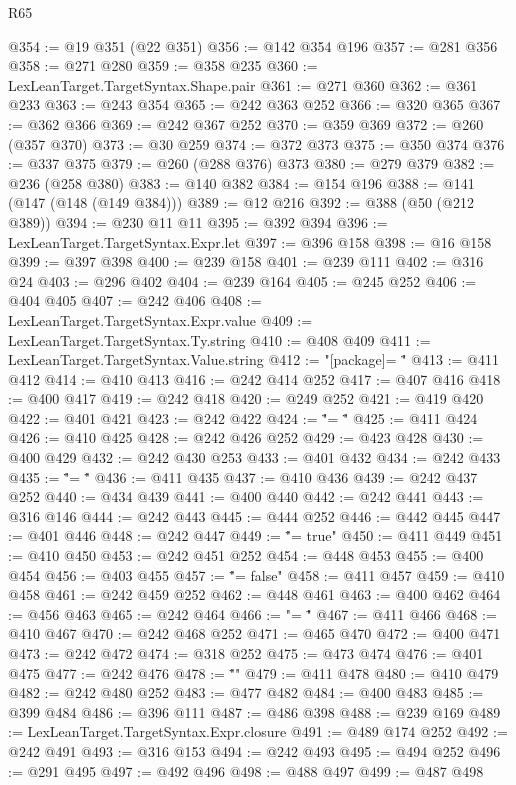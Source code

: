 \begin{lexlean}{R65}
\begin{coremodule}
@354 := @19 @351 (@22 @351)
@356 := @142 @354 @196
@357 := @281 @356
@358 := @271 @280
@359 := @358 @235
@360 := LexLeanTarget.TargetSyntax.Shape.pair
@361 := @271 @360
@362 := @361 @233
@363 := @243 @354
@365 := @242 @363 @252
@366 := @320 @365
@367 := @362 @366
@369 := @242 @367 @252
@370 := @359 @369
@372 := @260 (@357 @370)
@373 := @30 @259
@374 := @372 @373
@375 := @350 @374
@376 := @337 @375
@379 := @260 (@288 @376) @373
@380 := @279 @379
@382 := @236 (@258 @380)
@383 := @140 @382
@384 := @154 @196
@388 := @141 (@147 (@148 (@149 @384)))
@389 := @12 @216
@392 := @388 (@50 (@212 @389))
@394 := @230 @11 @11
@395 := @392 @394
@396 := LexLeanTarget.TargetSyntax.Expr.let
@397 := @396 @158
@398 := @16 @158
@399 := @397 @398
@400 := @239 @158
@401 := @239 @111
@402 := @316 @24
@403 := @296 @402
@404 := @239 @164
@405 := @245 @252
@406 := @404 @405
@407 := @242 @406
@408 := LexLeanTarget.TargetSyntax.Expr.value
@409 := LexLeanTarget.TargetSyntax.Ty.string
@410 := @408 @409
@411 := LexLeanTarget.TargetSyntax.Value.string
@412 := "[package]\nname = \""
@413 := @411 @412
@414 := @410 @413
@416 := @242 @414 @252
@417 := @407 @416
@418 := @400 @417
@419 := @242 @418
@420 := @249 @252
@421 := @419 @420
@422 := @401 @421
@423 := @242 @422
@424 := "\"\nversion = \""
@425 := @411 @424
@426 := @410 @425
@428 := @242 @426 @252
@429 := @423 @428
@430 := @400 @429
@432 := @242 @430 @253
@433 := @401 @432
@434 := @242 @433
@435 := "\"\nedition = \""
@436 := @411 @435
@437 := @410 @436
@439 := @242 @437 @252
@440 := @434 @439
@441 := @400 @440
@442 := @242 @441
@443 := @316 @146
@444 := @242 @443
@445 := @444 @252
@446 := @442 @445
@447 := @401 @446
@448 := @242 @447
@449 := "\"\npublish = true"
@450 := @411 @449
@451 := @410 @450
@453 := @242 @451 @252
@454 := @448 @453
@455 := @400 @454
@456 := @403 @455
@457 := "\"\npublish = false"
@458 := @411 @457
@459 := @410 @458
@461 := @242 @459 @252
@462 := @448 @461
@463 := @400 @462
@464 := @456 @463
@465 := @242 @464
@466 := "\n\n[lib]\npath = \""
@467 := @411 @466
@468 := @410 @467
@470 := @242 @468 @252
@471 := @465 @470
@472 := @400 @471
@473 := @242 @472
@474 := @318 @252
@475 := @473 @474
@476 := @401 @475
@477 := @242 @476
@478 := "\"\n{}\n"
@479 := @411 @478
@480 := @410 @479
@482 := @242 @480 @252
@483 := @477 @482
@484 := @400 @483
@485 := @399 @484
@486 := @396 @111
@487 := @486 @398
@488 := @239 @169
@489 := LexLeanTarget.TargetSyntax.Expr.closure
@491 := @489 @174 @252
@492 := @242 @491
@493 := @316 @153
@494 := @242 @493
@495 := @494 @252
@496 := @291 @495
@497 := @492 @496
@498 := @488 @497
@499 := @487 @498

\end{coremodule}
\end{lexlean}
